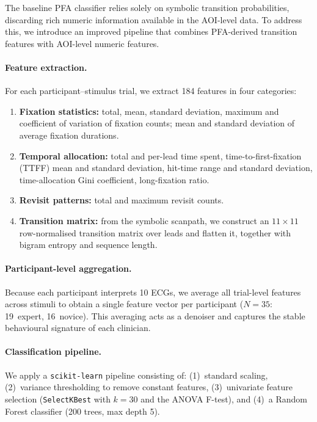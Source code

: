 \documentclass[sigconf]{acmart}
\theoremstyle{plain}
\theoremstyle{definition}
\begin{document}
The baseline PFA classifier relies solely on symbolic transition probabilities, discarding rich numeric information available in the AOI-level data.
To address this, we introduce an improved pipeline that combines PFA-derived transition features with AOI-level numeric features.

\paragraph{Feature extraction.}
For each participant--stimulus trial, we extract 184 features in four categories:
\begin{enumerate}
    \item \textbf{Fixation statistics:} total, mean, standard deviation, maximum and coefficient of variation of fixation counts; mean and standard deviation of average fixation durations.
    \item \textbf{Temporal allocation:} total and per-lead time spent, time-to-first-fixation (TTFF) mean and standard deviation, hit-time range and standard deviation, time-allocation Gini coefficient, long-fixation ratio.
    \item \textbf{Revisit patterns:} total and maximum revisit counts.
    \item \textbf{Transition matrix:} from the symbolic scanpath, we construct an $11 \times 11$ row-normalised transition matrix over leads and flatten it, together with bigram entropy and sequence length.
\end{enumerate}

\paragraph{Participant-level aggregation.}
Because each participant interprets 10 ECGs, we average all trial-level features across stimuli to obtain a single feature vector per participant ($N = 35$: 19~expert, 16~novice).
This averaging acts as a denoiser and captures the stable behavioural signature of each clinician.

\paragraph{Classification pipeline.}
We apply a \texttt{scikit-learn} pipeline consisting of: (1)~standard scaling, (2)~variance thresholding to remove constant features, (3)~univariate feature selection (\texttt{SelectKBest} with $k=30$ and the ANOVA F-test), and (4)~a Random Forest classifier (200 trees, max depth 5).
\end{document}
